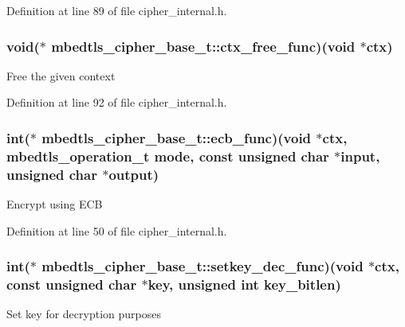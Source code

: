 Definition at line 89 of file cipher\-\_\-internal.\-h.

\hypertarget{structmbedtls__cipher__base__t_aa135cf3bd8a9aba15917e1909c4e55be}{
\subsubsection[{ctx\-\_\-free\-\_\-func}]{\setlength{\rightskip}{0pt plus 5cm}void($\ast$ mbedtls\-\_\-cipher\-\_\-base\-\_\-t\-::ctx\-\_\-free\-\_\-func)(void $\ast$ctx)}}\label{structmbedtls__cipher__base__t_aa135cf3bd8a9aba15917e1909c4e55be}
Free the given context 

Definition at line 92 of file cipher\-\_\-internal.\-h.

\hypertarget{structmbedtls__cipher__base__t_a121420c2b88c1d6ae21381b83689994a}{
\subsubsection[{ecb\-\_\-func}]{\setlength{\rightskip}{0pt plus 5cm}int($\ast$ mbedtls\-\_\-cipher\-\_\-base\-\_\-t\-::ecb\-\_\-func)(void $\ast$ctx, mbedtls\-\_\-operation\-\_\-t mode, const unsigned char $\ast$input, unsigned char $\ast$output)}}\label{structmbedtls__cipher__base__t_a121420c2b88c1d6ae21381b83689994a}
Encrypt using E\-C\-B 

Definition at line 50 of file cipher\-\_\-internal.\-h.

\hypertarget{structmbedtls__cipher__base__t_a23cd6e5b5beae65a6ff897c74ae24988}{
\subsubsection[{setkey\-\_\-dec\-\_\-func}]{\setlength{\rightskip}{0pt plus 5cm}int($\ast$ mbedtls\-\_\-cipher\-\_\-base\-\_\-t\-::setkey\-\_\-dec\-\_\-func)(void $\ast$ctx, const unsigned char $\ast$key, unsigned int key\-\_\-bitlen)}}\label{structmbedtls__cipher__base__t_a23cd6e5b5beae65a6ff897c74ae24988}
Set key for decryption purposes 

